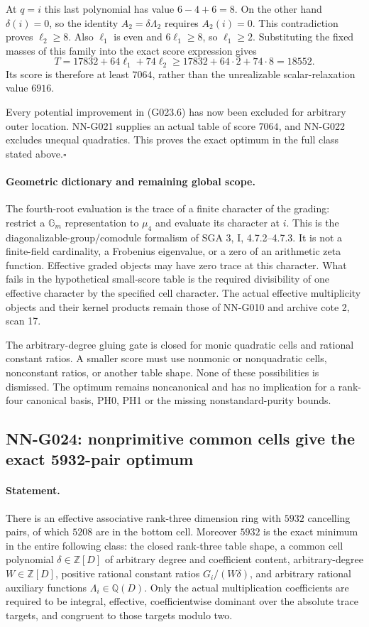 At $q=i$ this last polynomial has value $6-4+6=8$.
On the other hand $\delta(i)=0$, so the identity
$A_2=\delta\Lambda_2$ requires $A_2(i)=0$.
This contradiction proves $\ell_2\ge8$.
Also $\ell_1$ is even and $6\ell_1\ge8$, so
$\ell_1\ge2$. Substituting the fixed masses of this
family into the exact score expression gives
\[
 T=17832+64\ell_1+74\ell_2
       \ge17832+64\cdot2+74\cdot8=18552.
\]
Its score is therefore at least $7064$, rather than
the unrealizable scalar-relaxation value $6916$.

Every potential improvement in (G023.6) has now been
excluded for arbitrary outer location. NN-G021 supplies
an actual table of score $7064$, and NN-G022 excludes
unequal quadratics. This proves the exact optimum in
the full class stated above.\hfill$\square$

\paragraph{Geometric dictionary and remaining global scope.}
The fourth-root evaluation is the trace of a finite
character of the grading: restrict a $\mathbb G_m$
representation to $\mu_4$ and evaluate its character at
$i$. This is the diagonalizable-group/comodule formalism
of SGA 3, I, 4.7.2--4.7.3. It is not a finite-field
cardinality, a Frobenius eigenvalue, or a zero of an
arithmetic zeta function. Effective graded objects may
have zero trace at this character. What fails in the
hypothetical small-score table is the required divisibility
of one effective character by the specified cell character.
The actual effective multiplicity objects and their
kernel products remain those of NN-G010 and archive
cote 2, scan 17.

The arbitrary-degree gluing gate is closed for monic
quadratic cells and rational constant ratios. A smaller
score must use nonmonic or nonquadratic cells, nonconstant
ratios, or another
table shape. None of these possibilities is dismissed.
The optimum remains noncanonical and has no implication
for a rank-four canonical basis, PH0, PH1 or the missing
nonstandard-purity bounds.

\subsection{NN-G024: nonprimitive common cells give the exact 5932-pair optimum}
\paragraph{Statement.}
There is an effective associative rank-three dimension ring with
$5932$ cancelling pairs, of which $5208$ are in the bottom cell.
Moreover $5932$ is the exact minimum in the entire following
class: the closed rank-three table shape, a common cell polynomial
$\delta\in\mathbb Z[D]$ of arbitrary degree and coefficient content,
arbitrary-degree $W\in\mathbb Z[D]$, positive rational constant
ratios $G_i/(W\delta)$, and arbitrary rational auxiliary functions
$\Lambda_i\in\mathbb Q(D)$. Only the actual multiplication
coefficients are required to be integral, effective, coefficientwise
dominant over the absolute trace targets, and congruent to those
targets modulo two.

